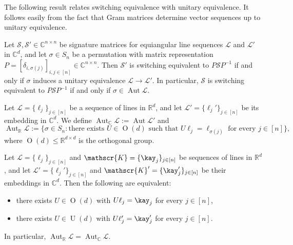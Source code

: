 The following result relates switching equivalence with unitary equivalence.
It follows easily from the fact that Gram matrices determine vector sequences up to unitary equivalence.

\begin{proposition}
\label{prop:switching equiv is unitary equiv}
Let $\mathcal{S},\mathcal{S'} \in \mathbb{C}^{n\times n}$ be signature matrices for equiangular line sequences $\mathscr{L}$ and $\mathscr{L}'$ in $\mathbb{C}^d$, and let $\sigma \in S_n$ be a permutation with matrix representation $P = [ \delta_{i,\sigma(j)} ]_{i,j \in [n]} \in \mathbb{C}^{n\times n}$.
Then $\mathcal{S}'$ is switching equivalent to $P \mathcal{S} P^{-1}$ if and only if $\sigma$ induces a unitary equivalence $\mathscr{L} \to \mathscr{L}'$.
In particular, $\mathcal{S}$ is switching equivalent to $P \mathcal{S} P^{-1}$ if and only if $\sigma \in \operatorname{Aut} \mathscr{L}$.
\end{proposition}

\begin{definition}
\label{def:autRC}
Let $\mathscr{L} = \{ \ell_j \}_{j\in [n]}$ be a sequence of lines in $\mathbb{R}^d$, and let $\mathscr{L}' = \{ \ell_j ' \}_{j\in [n]}$ be its embedding in $\mathbb{C}^d$.
We define $\operatorname{Aut}_{\mathbb{C}} \mathscr{L} := \operatorname{Aut} \mathscr{L}'$ and
\[ \operatorname{Aut}_{\mathbb{R}} \mathscr{L} := \{ \sigma \in S_n : \text{there exists } U \in \operatorname{O}(d) \text{ such that } U \ell_j = \ell_{\sigma(j)} \text{ for every } j \in [n] \}, \]
where $\operatorname{O}(d) \leq \mathbb{R}^{d\times d}$ is the orthogonal group.
\end{definition}

\begin{lemma}
\label{lem:orthogonal equiv}
Let $\mathscr{L} = \{ \ell_j \}_{j \in [n]}$ and $\mathscr{K} = \{ \kay_j \}_{j\in [n]}$ be sequences of lines in $\mathbb{R}^d$, and let $\mathscr{L}' = \{ \ell_j' \}_{j \in [n]}$ and $\mathscr{K}' = \{ \kay_j' \}_{j \in [n]}$ be their embeddings in $\mathbb{C}^d$.
Then the following are equivalent:
\begin{itemize}
\item[(a)]
there exists $U \in \operatorname{O}(d)$ with $U \ell_j = \kay_j$ for every $j \in [n]$,
\item[(b)]
there exists $U \in \operatorname{U}(d)$ with $U \ell_j' = \kay_j'$ for every $j \in [n]$.
\end{itemize}
In particular, $\operatorname{Aut}_{\mathbb{R}} \mathscr{L} = \operatorname{Aut}_{\mathbb{C}} \mathscr{L}$.
\end{lemma}

